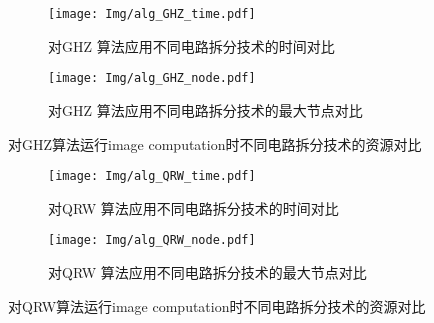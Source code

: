 \begin{figure}[!htbp]
    \centering
    \begin{subfigure}[b]{.4\textwidth}
        \centering
        \texttt{[image: Img/alg\_GHZ\_time.pdf]}
        \caption{对GHZ 算法应用不同电路拆分技术的时间对比}
        \label{fig:GHZ-time}
    \end{subfigure}
    \qquad
    \begin{subfigure}[b]{.4\textwidth}
        \centering
        \texttt{[image: Img/alg\_GHZ\_node.pdf]}
        \caption{对GHZ 算法应用不同电路拆分技术的最大节点对比}
        \label{fig:GHZ-node}
    \end{subfigure}
    \caption{对GHZ算法运行image computation时不同电路拆分技术的资源对比}
    \label{fig:GHZ-compare}
\end{figure}
\begin{figure}[!htbp]
    \centering
    \begin{subfigure}[b]{.4\textwidth}
        \centering
        \texttt{[image: Img/alg\_QRW\_time.pdf]}
        \caption{对QRW 算法应用不同电路拆分技术的时间对比}
        \label{fig:QRW-time}
    \end{subfigure}
    \qquad
    \begin{subfigure}[b]{.4\textwidth}
        \centering
        \texttt{[image: Img/alg\_QRW\_node.pdf]}
        \caption{对QRW 算法应用不同电路拆分技术的最大节点对比}
        \label{fig:QRW-node}
    \end{subfigure}
    \caption{对QRW算法运行image computation时不同电路拆分技术的资源对比}
    \label{fig:QRW-compare}
\end{figure}

